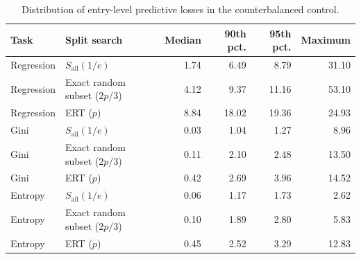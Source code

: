 \begin{table}[t]
\centering
\small
\caption{Distribution of entry-level predictive losses in the counterbalanced control.}
\label{tab:supp_tail_losses}
\begin{tabular}{llrrrr}
\toprule
Task & Split search & Median & 90th pct. & 95th pct. & Maximum \\
\midrule
Regression & $S_{\mathrm{all}}(1/e)$ & 1.74 & 6.49 & 8.79 & 31.10 \\
Regression & Exact random subset ($2p/3$) & 4.12 & 9.37 & 11.16 & 53.10 \\
Regression & ERT ($p$) & 8.84 & 18.02 & 19.36 & 24.93 \\
Gini & $S_{\mathrm{all}}(1/e)$ & 0.03 & 1.04 & 1.27 & 8.96 \\
Gini & Exact random subset ($2p/3$) & 0.11 & 2.10 & 2.48 & 13.50 \\
Gini & ERT ($p$) & 0.42 & 2.69 & 3.96 & 14.52 \\
Entropy & $S_{\mathrm{all}}(1/e)$ & 0.06 & 1.17 & 1.73 & 2.62 \\
Entropy & Exact random subset ($2p/3$) & 0.10 & 1.89 & 2.80 & 5.83 \\
Entropy & ERT ($p$) & 0.45 & 2.52 & 3.29 & 12.83 \\
\bottomrule
\end{tabular}
\end{table}
